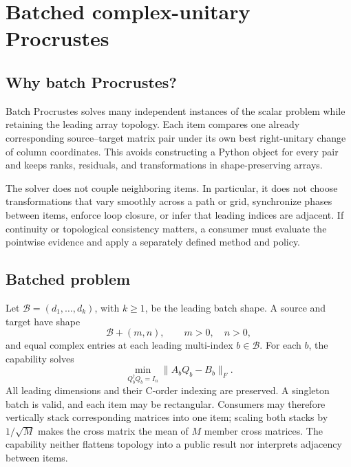 \chapter{Batched complex-unitary Procrustes}

\section{Why batch Procrustes?}
Batch Procrustes solves many independent instances of the scalar problem while retaining
the leading array topology. Each item compares one already corresponding source--target
matrix pair under its own best right-unitary change of column coordinates. This avoids
constructing a Python object for every pair and keeps ranks, residuals, and transformations
in shape-preserving arrays.

The solver does not couple neighboring items. In particular, it does not choose
transformations that vary smoothly across a path or grid, synchronize phases between
items, enforce loop closure, or infer that leading indices are adjacent. If continuity or
topological consistency matters, a consumer must evaluate the pointwise evidence and
apply a separately defined method and policy.

\section{Batched problem}
Let $\mathcal{B}=(d_1,\ldots,d_k)$, with $k\ge1$, be the leading batch shape. A source
and target have shape
\[
  \mathcal{B}\mathbin{+}(m,n),
  \qquad m>0,\quad n>0,
\]
and equal complex entries at each leading multi-index $b\in\mathcal{B}$. For each $b$,
the capability solves
\[
  \min_{Q_b^\dagger Q_b=I_n}\lVert A_bQ_b-B_b\rVert_F.
\]
All leading dimensions and their C-order indexing are preserved. A singleton batch is
valid, and each item may be rectangular. Consumers may therefore vertically stack
corresponding matrices into one item; scaling both stacks by $1/\sqrt{M}$ makes the cross
matrix the mean of $M$ member cross matrices. The capability neither flattens topology
into a public result nor interprets adjacency between items.

